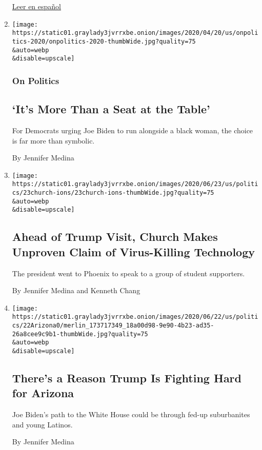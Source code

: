 \begin{enumerate}
  \href{https://www.nytimes3xbfgragh.onion/es/2020/07/03/espanol/latinos-racismo.html}{Leer
  en español}
\item
  \href{/2020/06/29/us/politics/biden-black-woman-running-mate.html}{}

  \texttt{[image: https://static01.graylady3jvrrxbe.onion/images/2020/04/20/us/onpolitics-2020/onpolitics-2020-thumbWide.jpg?quality=75\\\&auto=webp\\\&disable=upscale]}

  \hypertarget{on-politics}{%
  \subsubsection{On Politics}\label{on-politics}}

  \hypertarget{its-more-than-a-seat-at-the-table}{%
  \subsection{`It's More Than a Seat at the
  Table'}\label{its-more-than-a-seat-at-the-table}}

  For Democrats urging Joe Biden to run alongside a black woman, the
  choice is far more than symbolic.

  By Jennifer Medina
\item
  \href{/2020/06/23/us/politics/trump-arizona-church-covid.html}{}

  \texttt{[image: https://static01.graylady3jvrrxbe.onion/images/2020/06/23/us/politics/23church-ions/23church-ions-thumbWide.jpg?quality=75\\\&auto=webp\\\&disable=upscale]}

  \hypertarget{ahead-of-trump-visit-church-makes-unproven-claim-of-virus-killing-technology}{%
  \subsection{Ahead of Trump Visit, Church Makes Unproven Claim of
  Virus-Killing
  Technology}\label{ahead-of-trump-visit-church-makes-unproven-claim-of-virus-killing-technology}}

  The president went to Phoenix to speak to a group of student
  supporters.

  By Jennifer Medina and Kenneth Chang
\item
  \href{/2020/06/23/us/politics/arizona-2020-election-democrats-republicans.html}{}

  \texttt{[image: https://static01.graylady3jvrrxbe.onion/images/2020/06/22/us/politics/22Arizona0/merlin\_173717349\_18a00d98-9e90-4b23-ad35-26a8cee9c9b1-thumbWide.jpg?quality=75\\\&auto=webp\\\&disable=upscale]}

  \hypertarget{theres-a-reason-trump-is-fighting-hard-for-arizona}{%
  \subsection{There's a Reason Trump Is Fighting Hard for
  Arizona}\label{theres-a-reason-trump-is-fighting-hard-for-arizona}}

  Joe Biden's path to the White House could be through fed-up
  suburbanites and young Latinos.

  By Jennifer Medina
\end{enumerate}

